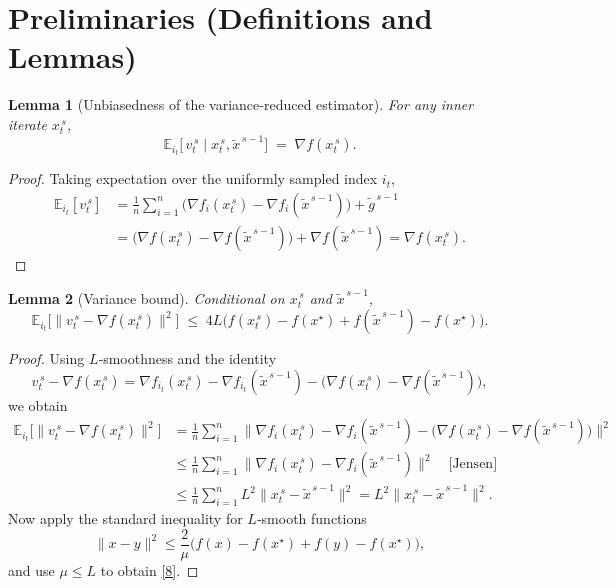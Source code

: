 \documentclass[11pt]{article}
\newtheorem{lemma}{Lemma}[section]
\begin{document}
\section*{Preliminaries (Definitions and Lemmas)}
\begin{lemma}[Unbiasedness of the variance‑reduced estimator]\label{lem:unbiased}
For any inner iterate $x_t^{\,s}$,
\[
\mathbb{E}_{i_t}\!\bigl[\,v_t^{\,s}\mid x_t^{\,s},\tilde{x}^{\,s-1}\bigr]
\;=\;
\nabla f(x_t^{\,s}).
\]
\end{lemma}
\begin{proof}
Taking expectation over the uniformly sampled index $i_t$,
\[
\begin{aligned}
\mathbb{E}_{i_t}[v_t^{\,s}]
&= \frac{1}{n}\sum_{i=1}^{n}\bigl(\nabla f_i(x_t^{\,s})-\nabla f_i(\tilde{x}^{\,s-1})\bigr)+\tilde{g}^{\,s-1}\\
&= \bigl(\nabla f(x_t^{\,s})-\nabla f(\tilde{x}^{\,s-1})\bigr)+\nabla f(\tilde{x}^{\,s-1})
= \nabla f(x_t^{\,s}) .
\end{aligned}
\]
\end{proof}

\begin{lemma}[Variance bound]\label{lem:varbound}
Conditional on $x_t^{\,s}$ and $\tilde{x}^{\,s-1}$,
\[
\mathbb{E}_{i_t}\!\bigl[\|v_t^{\,s}-\nabla f(x_t^{\,s})\|^2\bigr]
\;\le\;
4L\bigl(f(x_t^{\,s})-f(x^\star)+f(\tilde{x}^{\,s-1})-f(x^\star)\bigr).
\tag{8}
\]
\end{lemma}
\begin{proof}
Using $L$‑smoothness and the identity
\[
v_t^{\,s}-\nabla f(x_t^{\,s})
=
\nabla f_{i_t}(x_t^{\,s})-\nabla f_{i_t}(\tilde{x}^{\,s-1})
-\bigl(\nabla f(x_t^{\,s})-\nabla f(\tilde{x}^{\,s-1})\bigr),
\]
we obtain
\[
\begin{aligned}
\mathbb{E}_{i_t}\!\bigl[\|v_t^{\,s}-\nabla f(x_t^{\,s})\|^2\bigr]
&= \frac{1}{n}\sum_{i=1}^{n}\bigl\|\nabla f_i(x_t^{\,s})-\nabla f_i(\tilde{x}^{\,s-1})
-\bigl(\nabla f(x_t^{\,s})-\nabla f(\tilde{x}^{\,s-1})\bigr)\bigr\|^2\\
&\le \frac{1}{n}\sum_{i=1}^{n}\bigl\|\nabla f_i(x_t^{\,s})-\nabla f_i(\tilde{x}^{\,s-1})\bigr\|^2
\quad\text{[Jensen]}\\
&\le \frac{1}{n}\sum_{i=1}^{n} L^2\|x_t^{\,s}-\tilde{x}^{\,s-1}\|^2
= L^2\|x_t^{\,s}-\tilde{x}^{\,s-1}\|^2 .
\end{aligned}
\]
Now apply the standard inequality for $L$‑smooth functions
\[
\|x-y\|^2\le\frac{2}{\mu}\bigl(f(x)-f(x^\star)+f(y)-f(x^\star)\bigr),
\]
and use $\mu\le L$ to obtain \eqref{8}.
\end{proof}
\end{document}
